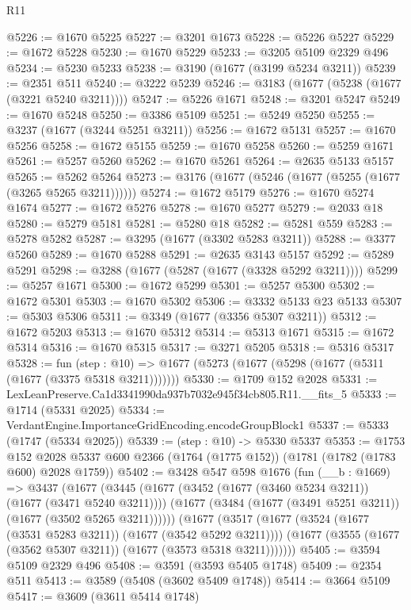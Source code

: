 \begin{lexlean}{R11}
\begin{coremodule}
@5226 := @1670 @5225
@5227 := @3201 @1673
@5228 := @5226 @5227
@5229 := @1672 @5228
@5230 := @1670 @5229
@5233 := @3205 @5109 @2329 @496
@5234 := @5230 @5233
@5238 := @3190 (@1677 (@3199 @5234 @3211))
@5239 := @2351 @511
@5240 := @3222 @5239
@5246 := @3183 (@1677 (@5238 (@1677 (@3221 @5240 @3211))))
@5247 := @5226 @1671
@5248 := @3201 @5247
@5249 := @1670 @5248
@5250 := @3386 @5109
@5251 := @5249 @5250
@5255 := @3237 (@1677 (@3244 @5251 @3211))
@5256 := @1672 @5131
@5257 := @1670 @5256
@5258 := @1672 @5155
@5259 := @1670 @5258
@5260 := @5259 @1671
@5261 := @5257 @5260
@5262 := @1670 @5261
@5264 := @2635 @5133 @5157
@5265 := @5262 @5264
@5273 := @3176 (@1677 (@5246 (@1677 (@5255 (@1677 (@3265 @5265 @3211))))))
@5274 := @1672 @5179
@5276 := @1670 @5274 @1674
@5277 := @1672 @5276
@5278 := @1670 @5277
@5279 := @2033 @18
@5280 := @5279 @5181
@5281 := @5280 @18
@5282 := @5281 @559
@5283 := @5278 @5282
@5287 := @3295 (@1677 (@3302 @5283 @3211))
@5288 := @3377 @5260
@5289 := @1670 @5288
@5291 := @2635 @3143 @5157
@5292 := @5289 @5291
@5298 := @3288 (@1677 (@5287 (@1677 (@3328 @5292 @3211))))
@5299 := @5257 @1671
@5300 := @1672 @5299
@5301 := @5257 @5300
@5302 := @1672 @5301
@5303 := @1670 @5302
@5306 := @3332 @5133 @23 @5133
@5307 := @5303 @5306
@5311 := @3349 (@1677 (@3356 @5307 @3211))
@5312 := @1672 @5203
@5313 := @1670 @5312
@5314 := @5313 @1671
@5315 := @1672 @5314
@5316 := @1670 @5315
@5317 := @3271 @5205
@5318 := @5316 @5317
@5328 := fun (step : @10) =>
  @1677 (@5273 (@1677 (@5298 (@1677 (@5311 (@1677 (@3375 @5318 @3211)))))))
@5330 := @1709 @152 @2028
@5331 := LexLeanPreserve.Ca1d3341990da937b7032e945f34cb805.R11.__fits_5
@5333 := @1714 (@5331 @2025)
@5334 := VerdantEngine.ImportanceGridEncoding.encodeGroupBlock1
@5337 := @5333 (@1747 (@5334 @2025))
@5339 := (step : @10) -> @5330 @5337
@5353 := @1753
    @152
    @2028
    @5337
    @600
    @2366
    (@1764 (@1775 @152))
    (@1781 (@1782 (@1783 @600) @2028 @1759))
@5402 := @3428
    @547
    @598
    @1676
    (fun (__b : @1669) =>
    @3437
      (@1677
        (@3445
          (@1677 (@3452 (@1677 (@3460 @5234 @3211)) (@1677 (@3471 @5240 @3211))))
          (@1677 (@3484 (@1677 (@3491 @5251 @3211)) (@1677 (@3502 @5265 @3211))))))
      (@1677
        (@3517
          (@1677 (@3524 (@1677 (@3531 @5283 @3211)) (@1677 (@3542 @5292 @3211))))
          (@1677 (@3555 (@1677 (@3562 @5307 @3211)) (@1677 (@3573 @5318 @3211)))))))
@5405 := @3594 @5109 @2329 @496
@5408 := @3591 (@3593 @5405 @1748)
@5409 := @2354 @511
@5413 := @3589 (@5408 (@3602 @5409 @1748))
@5414 := @3664 @5109
@5417 := @3609 (@3611 @5414 @1748)

\end{coremodule}
\end{lexlean}
